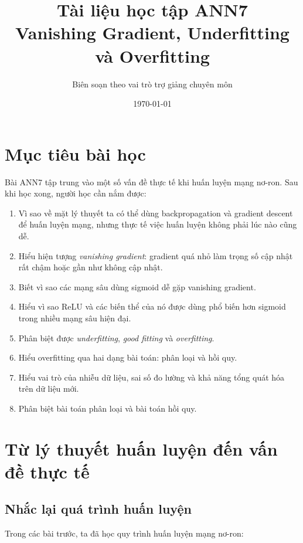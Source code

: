 \documentclass[12pt,a4paper]{report}
\title{
    \textbf{Tài liệu học tập ANN7}\\
    \large Vanishing Gradient, Underfitting và Overfitting
}
\author{Biên soạn theo vai trò trợ giảng chuyên môn}
\date{\today}
\begin{document}
\maketitle
\tableofcontents
\newpage

\chapter*{Mục tiêu bài học}

Bài ANN7 tập trung vào một số vấn đề thực tế khi huấn luyện mạng nơ-ron. Sau khi học xong, người học cần nắm được:

\begin{enumerate}[label=\arabic*.]
    \item Vì sao về mặt lý thuyết ta có thể dùng backpropagation và gradient descent để huấn luyện mạng, nhưng thực tế việc huấn luyện không phải lúc nào cũng dễ.
    \item Hiểu hiện tượng \textit{vanishing gradient}: gradient quá nhỏ làm trọng số cập nhật rất chậm hoặc gần như không cập nhật.
    \item Biết vì sao các mạng sâu dùng sigmoid dễ gặp vanishing gradient.
    \item Hiểu vì sao ReLU và các biến thể của nó được dùng phổ biến hơn sigmoid trong nhiều mạng sâu hiện đại.
    \item Phân biệt được \textit{underfitting}, \textit{good fitting} và \textit{overfitting}.
    \item Hiểu overfitting qua hai dạng bài toán: phân loại và hồi quy.
    \item Hiểu vai trò của nhiễu dữ liệu, sai số đo lường và khả năng tổng quát hóa trên dữ liệu mới.
    \item Phân biệt bài toán phân loại và bài toán hồi quy.
\end{enumerate}

\chapter{Từ lý thuyết huấn luyện đến vấn đề thực tế}

\section{Nhắc lại quá trình huấn luyện}

Trong các bài trước, ta đã học quy trình huấn luyện mạng nơ-ron:
\end{document}
